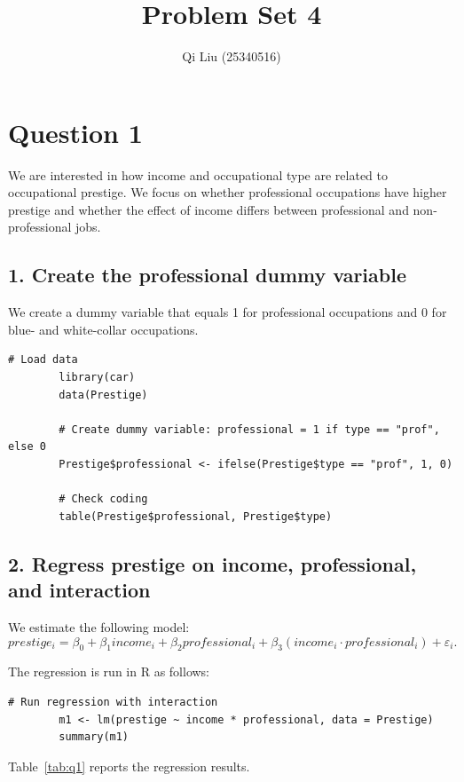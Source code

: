 \documentclass[12pt]{article}
\title{Problem Set 4}
\author{Qi Liu (25340516)}
\date{}
\begin{document}
	
	\maketitle
	
	\section*{Question 1}
	
	We are interested in how income and occupational type are related to
	occupational prestige. We focus on whether professional occupations have
	higher prestige and whether the effect of income differs between
	professional and non-professional jobs.
	
	\subsection*{1. Create the professional dummy variable}
	
	We create a dummy variable that equals 1 for professional occupations and
	0 for blue- and white-collar occupations.
	
	\begin{lstlisting}[style=RStyle]
		# Load data
		library(car)
		data(Prestige)
		
		# Create dummy variable: professional = 1 if type == "prof", else 0
		Prestige$professional <- ifelse(Prestige$type == "prof", 1, 0)
		
		# Check coding
		table(Prestige$professional, Prestige$type)
	\end{lstlisting}
	
	\subsection*{2. Regress prestige on income, professional, and interaction}
	
	We estimate the following model:
	\[
	prestige_i = \beta_0 + \beta_1 income_i + \beta_2 professional_i
	+ \beta_3 (income_i \cdot professional_i) + \varepsilon_i.
	\]
	
	The regression is run in R as follows:
	
	\begin{lstlisting}[style=RStyle]
		# Run regression with interaction
		m1 <- lm(prestige ~ income * professional, data = Prestige)
		summary(m1)
	\end{lstlisting}
	
	Table~\ref{tab:q1} reports the regression results.
	
\end{document}
